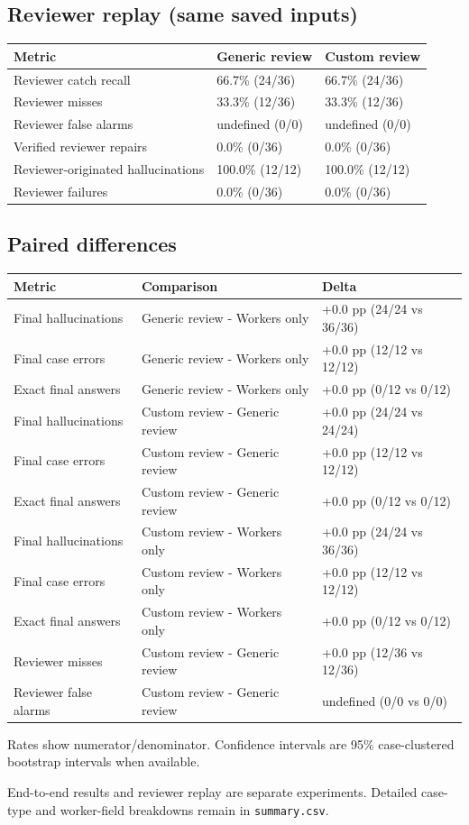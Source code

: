 \documentclass{article}
\begin{document}
\subsection*{Reviewer replay (same saved inputs)}
\begin{center}
\small
\begin{tabularx}{\linewidth}{lXX}
\toprule
Metric & Generic review & Custom review \\
\midrule
Reviewer catch recall & 66.7\% (24/36) & 66.7\% (24/36) \\
Reviewer misses & 33.3\% (12/36) & 33.3\% (12/36) \\
Reviewer false alarms & undefined (0/0) & undefined (0/0) \\
Verified reviewer repairs & 0.0\% (0/36) & 0.0\% (0/36) \\
Reviewer-originated hallucinations & 100.0\% (12/12) & 100.0\% (12/12) \\
Reviewer failures & 0.0\% (0/36) & 0.0\% (0/36) \\
\bottomrule
\end{tabularx}
\end{center}
\subsection*{Paired differences}
\begin{center}
\small
\begin{tabularx}{\linewidth}{lXX}
\toprule
Metric & Comparison & Delta \\
\midrule
Final hallucinations & Generic review - Workers only & +0.0 pp (24/24 vs 36/36) \\
Final case errors & Generic review - Workers only & +0.0 pp (12/12 vs 12/12) \\
Exact final answers & Generic review - Workers only & +0.0 pp (0/12 vs 0/12) \\
Final hallucinations & Custom review - Generic review & +0.0 pp (24/24 vs 24/24) \\
Final case errors & Custom review - Generic review & +0.0 pp (12/12 vs 12/12) \\
Exact final answers & Custom review - Generic review & +0.0 pp (0/12 vs 0/12) \\
Final hallucinations & Custom review - Workers only & +0.0 pp (24/24 vs 36/36) \\
Final case errors & Custom review - Workers only & +0.0 pp (12/12 vs 12/12) \\
Exact final answers & Custom review - Workers only & +0.0 pp (0/12 vs 0/12) \\
Reviewer misses & Custom review - Generic review & +0.0 pp (12/36 vs 12/36) \\
Reviewer false alarms & Custom review - Generic review & undefined (0/0 vs 0/0) \\
\bottomrule
\end{tabularx}
\end{center}
\noindent Rates show numerator/denominator. Confidence intervals are 95\% case-clustered bootstrap intervals when available.
\par End-to-end results and reviewer replay are separate experiments. Detailed case-type and worker-field breakdowns remain in \texttt{summary.csv}.
\end{document}
